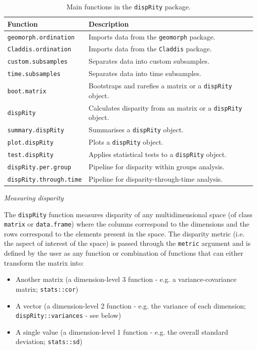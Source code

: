 \documentclass[12pt,letterpaper]{article}
\renewcommand{\subsection}[1]{%
\bigskip
\begin{center}
\begin{large}
\normalfont\itshape #1
\end{large}
\end{center}}
\newcommand{\disp}{\texttt{dispRity} }
\begin{document}
\begin{table}
    \begin{tabular}{ll}
        \hline
        Function & Description \\ 
        \hline
        \texttt{geomorph.ordination} & Imports data from the \texttt{geomorph} package. \\
        \texttt{Claddis.ordination} & Imports data from the \texttt{Claddis} package. \\
        \texttt{custom.subsamples} & Separates data into custom subsamples. \\
        \texttt{time.subsamples} & Separates data into time subsamples. \\
        \texttt{boot.matrix} & Bootstraps and rarefies a matrix or a \disp object. \\
        \disp & Calculates disparity from an matrix or a \disp object. \\
        \texttt{summary.dispRity} & Summarises a \disp object. \\
        \texttt{plot.dispRity} & Plots a \disp object. \\
        \texttt{test.dispRity} & Applies statistical tests to a \disp object.\\
        \texttt{dispRity.per.group} & Pipeline for disparity within groups analysis. \\
        \texttt{dispRity.through.time} & Pipeline for disparity-through-time analysis. \\
        \hline
    \end{tabular}
    \caption{Main functions in the \disp package.}
    \label{Tab:main_fun}
\end{table}

\subsection{Measuring disparity}
The \disp function measures disparity of any multidimensional space (of class \texttt{matrix} or \texttt{data.frame}) where the columns correspond to the dimensions and the rows correspond to the elements present in the space.
The disparity metric (i.e. the aspect of interest of the space) is passed through the \texttt{metric} argument and is defined by the user as any function or combination of functions that can either transform the matrix into:

\begin{itemize}
    \item Another matrix (a dimension-level 3 function - e.g. a variance-covariance matrix; \texttt{stats::cor})
    \item A vector (a dimension-level 2 function - e.g. the variance of each dimension; \texttt{dispRity::variances} - see below)
    \item A single value (a dimension-level 1 function - e.g. the overall standard deviation; \texttt{stats::sd})
\end{itemize}
\end{document}
